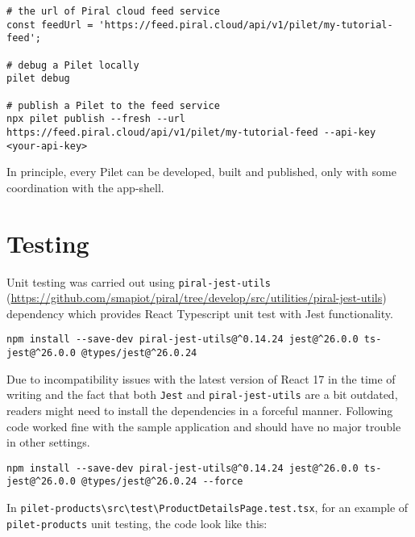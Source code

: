 \documentclass[a4paper]{book}
\begin{document}
\begin{lstlisting}[caption={Publishing Pilets \url{https://docs.piral.io/guidelines/tutorials/03-publishing-pilets}}]
# the url of Piral cloud feed service
const feedUrl = 'https://feed.piral.cloud/api/v1/pilet/my-tutorial-feed';

# debug a Pilet locally
pilet debug

# publish a Pilet to the feed service
npx pilet publish --fresh --url https://feed.piral.cloud/api/v1/pilet/my-tutorial-feed --api-key <your-api-key>
\end{lstlisting}

In principle, every Pilet can be developed, built and published, only with some coordination with the app-shell.
\section{Testing}

Unit testing was carried out using \verb|piral-jest-utils| (\url{https://github.com/smapiot/piral/tree/develop/src/utilities/piral-jest-utils}) dependency which provides React Typescript unit test with Jest \cite{Jest} functionality.

\begin{lstlisting}[caption={piral-jest-utils installation with recommended versions}]
  npm install --save-dev piral-jest-utils@^0.14.24 jest@^26.0.0 ts-jest@^26.0.0 @types/jest@^26.0.24
\end{lstlisting}

Due to incompatibility issues with the latest version of React 17 in the time of writing and the fact that both \verb|Jest| and \verb|piral-jest-utils| are a bit outdated, readers might need to install the dependencies in a forceful manner. Following code worked fine with the sample application and should have no major trouble in other settings.

\begin{lstlisting}[caption={piral-jest-utils installation in force mode}]
  npm install --save-dev piral-jest-utils@^0.14.24 jest@^26.0.0 ts-jest@^26.0.0 @types/jest@^26.0.24 --force 
\end{lstlisting}

In \verb|pilet-products\src\test\ProductDetailsPage.test.tsx|, for an example of \verb|pilet-products| unit testing, the code look like this:
\end{document}
